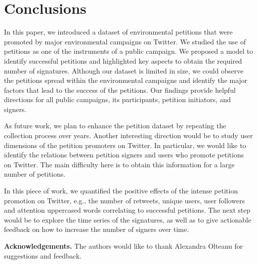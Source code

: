 \section{Conclusions}
In this paper, we introduced a dataset of environmental petitions that were promoted by major environmental campaigns on Twitter.
We studied the use of petitions as one of the instruments of a public campaign.
We proposed a model to identify successful petitions and highlighted key aspects to obtain the required number of signatures.
Although our dataset is limited in size, we could observe the petitions spread within the environmental campaigns and identify the major factors that lead to the success of the petitions.
Our findings provide helpful directions for all public campaigns, its participants, petition initiators, and signers.

As future work, we plan to enhance the petition dataset by repeating the collection process over years.
Another interesting direction would be to study user dimensions of the petition promoters on Twitter. In particular, we would like to identify the relations between petition signers and users who promote petitions on Twitter. The main difficulty here is to obtain this information for a large number of petitions.

In this piece of work, we quantified the positive effects of the intense petition promotion on Twitter, e.g., the number of retweets, unique users, user followers and attention uppercased words correlating to successful petitions.
The next step would be to explore the time series of the signatures, as well as to give actionable feedback on how to increase the number of signers over time.

\noindent \textbf{Acknowledgements.} The authors would like to thank Alexandra Olteanu for suggestions and feedback.